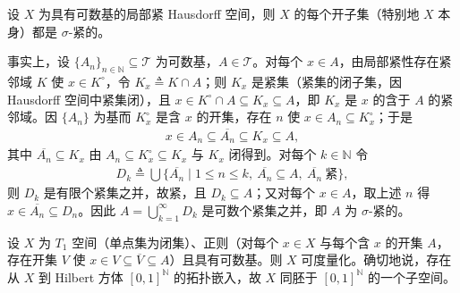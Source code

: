 \documentclass[../main.tex]{subfiles}
\begin{document}
\begin{remark}\label{remark:appA-可数基局部紧}
设 $X$ 为具有可数基的局部紧 Hausdorff 空间，则 $X$ 的每个开子集（特别地 $X$ 本身）都是 $\sigma$-紧的。

事实上，设 $\{A_n\}_{n\in\mathbb{N}}\subseteq\mathscr{T}$ 为可数基，$A\in\mathscr{T}$。对每个 $x\in A$，由局部紧性存在紧邻域 $K$ 使 $x\in K^\circ$，令 $K_x\triangleq K\cap A$；则 $K_x$ 是紧集（紧集的闭子集，因 Hausdorff 空间中紧集闭），且 $x\in K^\circ\cap A\subseteq K_x\subseteq A$，即 $K_x$ 是 $x$ 的含于 $A$ 的紧邻域。因 $\{A_n\}$ 为基而 $K_x^\circ$ 是含 $x$ 的开集，存在 $n$ 使 $x\in A_n\subseteq K_x^\circ$；于是
\begin{align*}
x\in A_n\subseteq\overline{A_n}\subseteq K_x\subseteq A,
\end{align*}
其中 $\overline{A_n}\subseteq K_x$ 由 $A_n\subseteq K_x^\circ\subseteq K_x$ 与 $K_x$ 闭得到。对每个 $k\in\mathbb{N}$ 令
\begin{align*}
D_k\triangleq\bigcup\{\overline{A_n}\mid 1\leqslant n\leqslant k,\ \overline{A_n}\subseteq A,\ \overline{A_n}\ \text{紧}\},
\end{align*}
则 $D_k$ 是有限个紧集之并，故紧，且 $D_k\subseteq A$；又对每个 $x\in A$，取上述 $n$ 得 $x\in\overline{A_n}\subseteq D_n$。因此 $A=\bigcup_{k=1}^\infty D_k$ 是可数个紧集之并，即 $A$ 为 $\sigma$-紧的。
\end{remark}

\begin{theorem}\label{theorem:appA-Urysohn度量化}
设 $X$ 为 $T_1$ 空间（单点集为闭集）、正则（对每个 $x\in X$ 与每个含 $x$ 的开集 $A$，存在开集 $V$ 使 $x\in V\subseteq\overline{V}\subseteq A$）且具有可数基。则 $X$ 可度量化。确切地说，存在从 $X$ 到 Hilbert 方体 $[0,1]^{\mathbb{N}}$ 的拓扑嵌入，故 $X$ 同胚于 $[0,1]^{\mathbb{N}}$ 的一个子空间。
\end{theorem}
\end{document}
